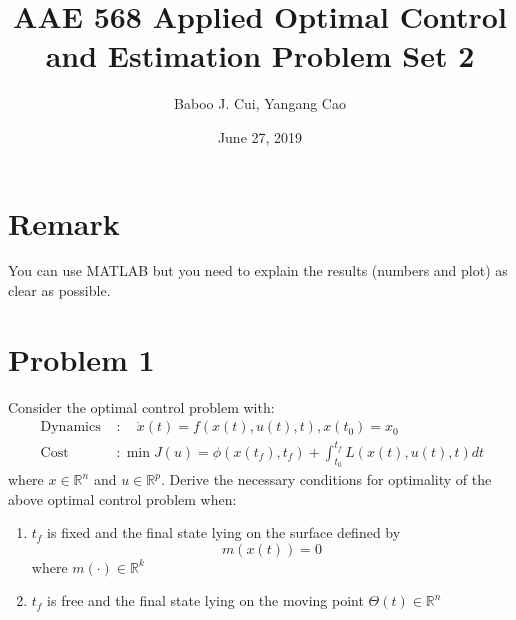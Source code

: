 \documentclass[10pt,a4paper,oneside]{article}
\date{June 27, 2019}
\author{Baboo J. Cui, Yangang Cao}
\title{AAE 568 Applied Optimal Control and Estimation Problem Set 2}
\begin{document}
\maketitle

\section*{Remark}
You can use MATLAB but you need to explain the results (numbers and plot) as clear as possible.
 \section* {Problem 1} 
 Consider the optimal control problem with:
 \[
 \begin{array}{ll}{\text { Dynamics }} & { : \quad \dot{x}(t)=f(x(t), u(t), t),x(t_0)=x_0} \\ {\text { Cost }} & { : \min J(u)=\phi\left(x\left(t_{f}\right), t_{f}\right)+\int_{t_{0}}^{t_{f}} L(x(t), u(t), t) d t}\end{array}
 \]
 where $x \in \mathbb{R}^{n}$ and $u \in \mathbb{R}^{p} .$ Derive the necessary conditions for optimality of the above optimal control problem when:
 \begin{enumerate}
 \item $t_{f}$ is fixed and the final state lying on the surface defined by
 \[
 m(x(t))=0
 \]
 where $m(\cdot) \in \mathbb{R}^{k}$
 \item $t_{f}$ is free and the final state lying on the moving point $\Theta(t) \in \mathbb{R}^{n}$
 \end{enumerate}
\end{document}
